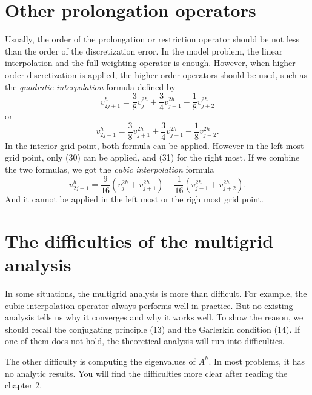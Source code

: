 \documentclass{SBCbookchapter}
\newcounter{chapter}\setcounter{chapter}{1}
\begin{document}
\section{Other prolongation operators}

Usually, the order of the prolongation or restriction operator should be not less than the order of the discretization error. In the model problem, the linear interpolation and the full-weighting operator is enough. However, when higher order discretization is applied, the higher order operators should be used, such as the \textit{quadratic interpolation} formula defined by
\begin{equation}
	v_{2j+1}^h = \frac{3}{8}v_{j}^{2h} + \frac{3}{4}v_{j+1}^{2h} - \frac{1}{8}v_{j+2}^{2h}
\end{equation}
or
\begin{equation}
	v_{2j-1}^h = \frac{3}{8}v_{j+1}^{2h} + \frac{3}{4}v_{j-1}^{2h} - \frac{1}{8}v_{j-2}^{2h}.
\end{equation}
In the interior grid point, both formula can be applied. However in the left most grid point, only (30) can be applied, and (31) for the right most. If we combine the two formulas, we got the \textit{cubic interpolation} formula
\begin{equation}
	v_{2j+1}^h = \frac{9}{16}\left(v_{j}^{2h}+v_{j+1}^{2h}\right) - \frac{1}{16}\left(v_{j-1}^{2h}+v_{j+2}^{2h}\right).
\end{equation}
And it cannot be applied in the left most or the righ most grid point.

\section{The difficulties of the multigrid analysis}

In some situations, the multigrid analysis is more than difficult. For example, the cubic interpolation operator always performs well in practice. But no existing analysis tells us why it converges and why it works well. To show the reason, we should recall the conjugating principle (13) and the Garlerkin condition (14). If one of them does not hold, the theoretical analysis will run into difficulties.

The other difficulty is computing the eigenvalues of $A^h$. In most problems, it has no analytic results. You will find the difficulties more clear after reading the chapter 2.

\vspace{3em}



\end{document}
